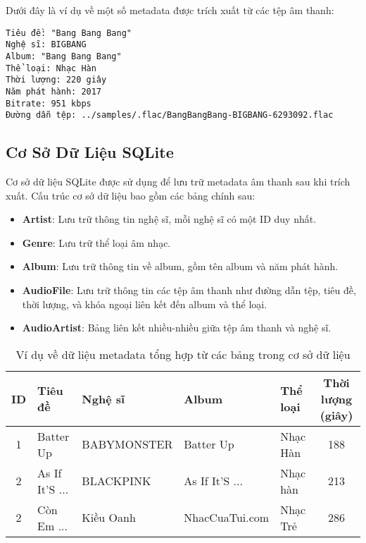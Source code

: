 \documentclass[conference]{IEEEtran}
\begin{document}
Dưới đây là ví dụ về một số metadata được trích xuất từ các tệp âm thanh:

\begin{verbatim}
Tiêu đề: "Bang Bang Bang"
Nghệ sĩ: BIGBANG
Album: "Bang Bang Bang"
Thể loại: Nhạc Hàn
Thời lượng: 220 giây
Năm phát hành: 2017
Bitrate: 951 kbps
Đường dẫn tệp: ../samples/.flac/BangBangBang-BIGBANG-6293092.flac
\end{verbatim}

\subsection{Cơ Sở Dữ Liệu SQLite}
Cơ sở dữ liệu SQLite được sử dụng để lưu trữ metadata âm thanh sau khi trích xuất. Cấu trúc cơ sở dữ liệu bao gồm các bảng chính sau:

\begin{itemize}
    \item \textbf{Artist}: Lưu trữ thông tin nghệ sĩ, mỗi nghệ sĩ có một ID duy nhất.
    \item \textbf{Genre}: Lưu trữ thể loại âm nhạc.
    \item \textbf{Album}: Lưu trữ thông tin về album, gồm tên album và năm phát hành.
    \item \textbf{AudioFile}: Lưu trữ thông tin các tệp âm thanh như đường dẫn tệp, tiêu đề, thời lượng, và khóa ngoại liên kết đến album và thể loại.
    \item \textbf{AudioArtist}: Bảng liên kết nhiều-nhiều giữa tệp âm thanh và nghệ sĩ.
\end{itemize}

\begin{table}[ht]
    \centering
    \scriptsize %
    \begin{tabular}{|c|l|l|l|l|c|}
    \hline
    \textbf{ID} & \textbf{Tiêu đề} & \textbf{Nghệ sĩ} & \textbf{Album} & \textbf{Thể loại} & \textbf{Thời lượng (giây)} \\ \hline
    1           & 	Batter Up     & BABYMONSTER       & Batter Up         & Nhạc Hàn              & 188 \\ \hline
    2           & As If It'S ... & BLACKPINK            & 	As If It'S ... & Nhạc hàn     & 213 \\ \hline
    2           & Còn Em ... & Kiều Oanh           & 	NhacCuaTui.com & Nhạc Trẻ     & 286 \\ \hline
    \end{tabular}
    \caption{Ví dụ về dữ liệu metadata tổng hợp từ các bảng trong cơ sở dữ liệu}
    \label{tab:metadata_example}
\end{table}
\end{document}
